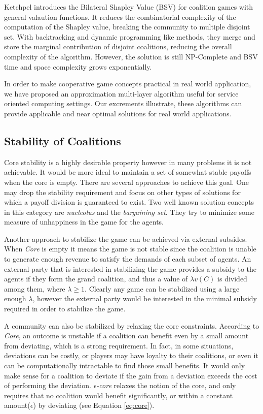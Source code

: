         Ketchpel introduces the Bilateral Shapley Value (BSV) \cite{conf/aaai/Ketchpel94a} for coalition games with general valaution functions.
        It reduces the combinatorial complexity of the computation of the Shapley value, breaking the community to multiple disjoint set.
        With backtracking and dynamic programming like methods, they merge and store the marginal contribution of disjoint coalitions,
        reducing the overall complexity of the algorithm. However, the solution is still NP-Complete and BSV time and space complexity grows exponentially.

        In order to make cooperative game concepts practical in real world application, we have proposed an approximation multi-layer
        algorithm useful for service oriented computing settings. Our excrements illustrate, these algorithms can provide
        applicable and near optimal solutions for real world applications.

\subsection{Stability of Coalitions}

Core stability is a highly desirable property however in many problems it is not achievable. It would be more ideal to maintain a set of somewhat stable payoffs when the core is empty. There are several approaches to achieve this goal. One may drop the stability requirement and focus on other types of solutions for which a payoff division is guaranteed to exist. Two well known solution concepts in this category are \emph{nucleolus}\cite{schmeidler_nucleolus_1969} and the \emph{bargaining set}\cite{Davis67existenceof}. They try to minimize some measure of unhappiness in the game for the agents.

Another approach to stabilize the game can be achieved via external subsides. When \emph{Core} is empty it means the game is not stable since the coalition is unable to generate enough revenue to satisfy the demands of each subset of agents. An external party that is interested in stabilizing the game provides a subsidy to the agents if they form the grand coalition, and thus a value of $\lambda v(C)$ is divided among them, where $\lambda \geq 1$. Clearly any game can be stabilized using a large enough $\lambda$, however the external party would be interested in the minimal subsidy required in order to stabilize the game.

A community can also be stabilized by relaxing the core constraints. According to \emph{Core}, an outcome is unstable if a coalition can benefit even by a small amount from deviating, which is a strong requirement. In fact, in some situations, deviations can be costly, or players may have loyalty to their coalitions, or even it can be computationally intractable to find those small benefits. It would only make sense for a coalition to deviate if the gain from a deviation exceeds the cost of performing the deviation. \emph{$\epsilon$-core} relaxes the notion of the core, and only requires that no coalition would benefit significantly, or within a constant amount($\epsilon$) by deviating (see Equation \ref{eq:core}). 


